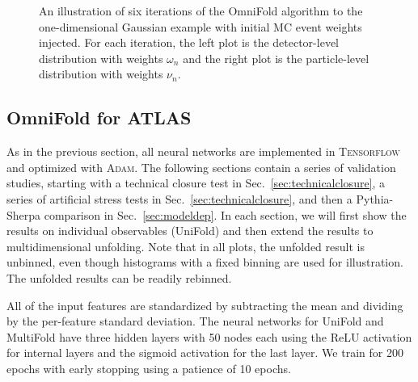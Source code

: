 \begin{figure}[h!]
\caption{An illustration of six iterations of the OmniFold algorithm to the one-dimensional Gaussian example with initial MC event weights injected.  For each iteration, the left plot is the detector-level distribution with weights $\omega_n$ and the right plot is the particle-level distribution with weights $\nu_n$.}
\label{fig:gaussian:MCiterations}
\end{figure}

\clearpage

\subsection{OmniFold for ATLAS}

As in the previous section, all neural networks are implemented in \textsc{Tensorflow} and optimized with \textsc{Adam}.  The following sections contain a series of validation studies, starting with a technical closure test in Sec.~\ref{sec:technicalclosure}, a series of artificial stress tests in Sec.~\ref{sec:technicalclosure}, and then a Pythia-Sherpa comparison in Sec.~\ref{sec:modeldep}.  In each section, we will first show the results on individual observables (UniFold) and then extend the results to multidimensional unfolding.  Note that in all plots, the unfolded result is unbinned, even though histograms with a fixed binning are used for illustration.  The unfolded results can be readily rebinned.

All of the input features are standardized by subtracting the mean and dividing by the per-feature standard deviation.  The neural networks for UniFold and MultiFold have three hidden layers with 50 nodes each using the ReLU activation for internal layers and the sigmoid activation for the last layer.  We train for 200 epochs with early stopping using a patience of 10 epochs.

